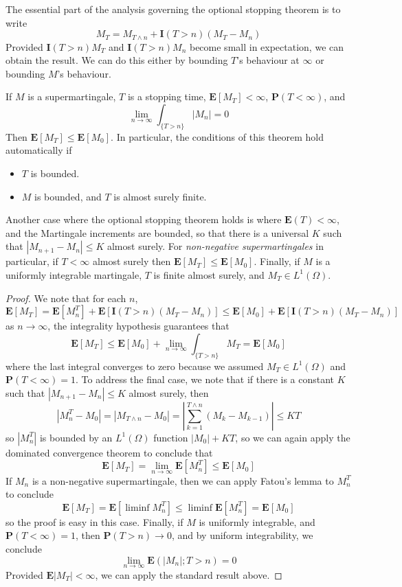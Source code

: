 The essential part of the analysis governing the optional stopping theorem is to write
%
\[ M_T = M_{T \wedge n} + \mathbf{I}(T > n) (M_T - M_n) \]
%
Provided $\mathbf{I}(T > n) M_T$ and $\mathbf{I}(T > n) M_n$ become small in expectation, we can obtain the result. We can do this either by bounding $T$'s behaviour at $\infty$ or bounding $M$'s behaviour.

\begin{theorem}
    If $M$ is a supermartingale, $T$ is a stopping time, $\mathbf{E}[M_T] < \infty$, $\mathbf{P}(T < \infty)$, and
    \[ \lim_{n \to \infty} \int_{\{ T > n \}} |M_n| = 0 \]
    Then $\mathbf{E}[M_T] \leq \mathbf{E}[M_0]$. In particular, the conditions of this theorem hold automatically if
    \begin{itemize}
        \item $T$ is bounded.
        \item $M$ is bounded, and $T$ is almost surely finite.
    \end{itemize}
    Another case where the optional stopping theorem holds is where $\mathbf{E}(T) < \infty$, and the Martingale increments are bounded, so that there is a universal $K$ such that $|M_{n+1} - M_n| \leq K$ almost surely. For {\it non-negative supermartingales} in particular, if $T < \infty$ almost surely then $\mathbf{E}[M_T] \leq \mathbf{E}[M_0]$. Finally, if $M$ is a uniformly integrable martingale, $T$ is finite almost surely, and $M_T \in L^1(\Omega)$.
\end{theorem}
\begin{proof}
    We note that for each $n$,
    \[ \mathbf{E}[M_T] = \mathbf{E}[M^T_n] + \mathbf{E}[\mathbf{I}(T > n)(M_T - M_n)] \leq \mathbf{E}[M_0] + \mathbf{E}[\mathbf{I}(T > n)(M_T - M_n)] \]
    as $n \to \infty$, the integrality hypothesis guarantees that
    \[ \mathbf{E}[M_T] \leq \mathbf{E}[M_0] + \lim_{n \to \infty} \int_{\{ T > n \}} M_T = \mathbf{E}[M_0] \]
    where the last integral converges to zero because we assumed $M_T \in L^1(\Omega)$ and $\mathbf{P}(T < \infty) = 1$. To address the final case, we note that if there is a constant $K$ such that $|M_{n+1} - M_n| \leq K$ almost surely, then
    \[ |M^T_n - M_0| = |M_{T \wedge n} - M_0| = \left| \sum_{k = 1}^{T \wedge n} (M_k - M_{k-1}) \right| \leq KT \]
    so $|M^T_n|$ is bounded by an $L^1(\Omega)$ function $|M_0| + KT$, so we can again apply the dominated convergence theorem to conclude that
    \[ \mathbf{E}[M_T] = \lim_{n \to \infty} \mathbf{E}[M^T_n] \leq \mathbf{E}[M_0] \]
    If $M_n$ is a non-negative supermartingale, then we can apply Fatou's lemma to $M_n^T$ to conclude
    \[ \mathbf{E}[M_T] = \mathbf{E}[\liminf M_n^T] \leq \liminf \mathbf{E}[M_n^T] = \mathbf{E}[M_0] \]
    so the proof is easy in this case. Finally, if $M$ is uniformly integrable, and $\mathbf{P}(T < \infty) = 1$, then $\mathbf{P}(T > n) \to 0$, and by uniform integrability, we conclude
    \[ \lim_{n \to \infty} \mathbf{E}(|M_n|; T > n) = 0 \]
    Provided $\mathbf{E}|M_T| < \infty$, we can apply the standard result above.
\end{proof}

